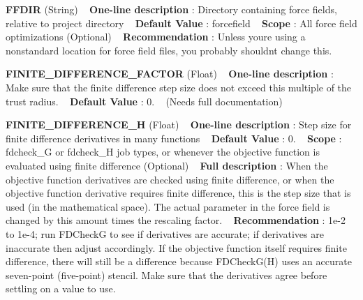 \begin{DoxyItemize}
\item {\bfseries  F\+F\+D\+IR } (String) ~\newline
{\bfseries  One-\/line description }\+: Directory containing force fields, relative to project directory ~\newline
{\bfseries  Default Value }\+: forcefield ~\newline
{\bfseries  Scope }\+: All force field optimizations (Optional) ~\newline
{\bfseries  Recommendation }\+: Unless you\textquotesingle{}re using a nonstandard location for force field files, you probably shouldn\textquotesingle{}t change this.\end{DoxyItemize}
\begin{DoxyItemize}
\item {\bfseries  F\+I\+N\+I\+T\+E\+\_\+\+D\+I\+F\+F\+E\+R\+E\+N\+C\+E\+\_\+\+F\+A\+C\+T\+OR } (Float) ~\newline
{\bfseries  One-\/line description }\+: Make sure that the finite difference step size does not exceed this multiple of the trust radius. ~\newline
{\bfseries  Default Value }\+: 0. ~\newline
(Needs full documentation)\end{DoxyItemize}
\begin{DoxyItemize}
\item {\bfseries  F\+I\+N\+I\+T\+E\+\_\+\+D\+I\+F\+F\+E\+R\+E\+N\+C\+E\+\_\+H } (Float) ~\newline
{\bfseries  One-\/line description }\+: Step size for finite difference derivatives in many functions ~\newline
{\bfseries  Default Value }\+: 0. ~\newline
{\bfseries  Scope }\+: fdcheck\+\_\+G or fdcheck\+\_\+H job types, or whenever the objective function is evaluated using finite difference (Optional) ~\newline
{\bfseries  Full description }\+: When the objective function derivatives are checked using finite difference, or when the objective function derivative requires finite difference, this is the step size that is used (in the mathematical space). The actual parameter in the force field is changed by this amount times the rescaling factor. ~\newline
{\bfseries  Recommendation }\+: 1e-\/2 to 1e-\/4; run F\+D\+CheckG to see if derivatives are accurate; if derivatives are inaccurate then adjust accordingly. If the objective function itself requires finite difference, there will still be a difference because F\+D\+Check\+G(\+H) uses an accurate seven-\/point (five-\/point) stencil. Make sure that the derivatives agree before settling on a value to use.\end{DoxyItemize}
